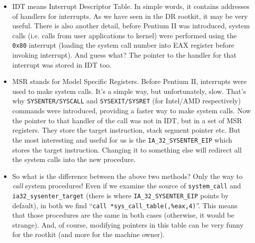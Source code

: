 \documentclass[12pt]{article}
\begin{document}
  \begin{itemize}
    \item IDT means Interrupt Descriptor Table. In simple words, it contains
      addresses of handlers for interrupts. As we have seen in the DR rootkit,
      it may be very useful. There is also another detail, before Pentium II
      was introduced, system calls (i.e. calls from user applications to
      kernel) were performed using the \verb!0x80!  interrupt (loading the
      system call number into EAX register before invoking interrupt). And
      guess what? The pointer to the handler for that interrupt was stored in
      IDT too.

    \item MSR stands for Model Specific Registers. Before Pentium II,
      interrupts were used to make system calls. It's a simple way, but
      unfortunately, slow. That's why \verb!SYSENTER/SYSCALL! and
      \verb!SYSEXIT/SYSRET! (for Intel/AMD respectively) commands were
      introduced, providing a faster way to make system calls. Now the pointer
      to that handler of the call was not in IDT, but in a set of MSR
      registers. They store the target instruction, stack segment pointer
      etc. But the most interesting and useful for us is the
      \verb!IA_32_SYSENTER_EIP! which stores the target instruction. Changing
      it to something else will redirect all the system calls into the new
      procedure.

    \item So what is the difference between the above two methods? Only the
      way to \emph{call} system procedures! Even if we examine the source of
      \verb!system_call! and \verb!ia32_sysenter_target! (there is where
      \verb!IA_32_SYSENTER_EIP!  points by default), in both we find
      ``\verb!call *sys_call_table(,%eax,4)!''. This means that those
      procedures are the same in both cases (otherwise, it would be
      strange). And, of course, modifying pointers in this table can be very
      funny for the rootkit (and more for the machine owner).
  \end{itemize}
\end{document}

